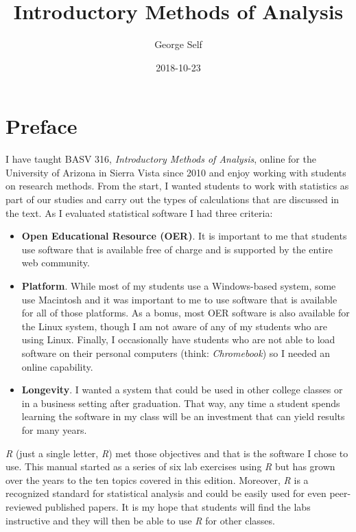 \documentclass[]{book}
\title{Introductory Methods of Analysis}
\author{George Self}
\date{2018-10-23}
\theoremstyle{definition}
\theoremstyle{definition}
\theoremstyle{definition}
\theoremstyle{remark}
\begin{document}
\maketitle

{
\setcounter{tocdepth}{1}
\tableofcontents
}
\hypertarget{preface}{%
\chapter*{Preface}\label{preface}}

I have taught BASV 316, \emph{Introductory Methods of Analysis}, online
for the University of Arizona in Sierra Vista since 2010 and enjoy
working with students on research methods. From the start, I wanted
students to work with statistics as part of our studies and carry out
the types of calculations that are discussed in the text. As I evaluated
statistical software I had three criteria:

\begin{itemize}
\item
  \textbf{Open Educational Resource (OER)}. It is important to me that
  students use software that is available free of charge and is
  supported by the entire web community.
\item
  \textbf{Platform}. While most of my students use a Windows-based
  system, some use Macintosh and it was important to me to use software
  that is available for all of those platforms. As a bonus, most OER
  software is also available for the Linux system, though I am not aware
  of any of my students who are using Linux. Finally, I occasionally
  have students who are not able to load software on their personal
  computers (think: \emph{Chromebook}) so I needed an online capability.
\item
  \textbf{Longevity}. I wanted a system that could be used in other
  college classes or in a business setting after graduation. That way,
  any time a student spends learning the software in my class will be an
  investment that can yield results for many years.
\end{itemize}

\emph{R} (just a single letter, \emph{R}) met those objectives and that
is the software I chose to use. This manual started as a series of six
lab exercises using \emph{R} but has grown over the years to the ten
topics covered in this edition. Moreover, \emph{R} is a recognized
standard for statistical analysis and could be easily used for even
peer-reviewed published papers. It is my hope that students will find
the labs instructive and they will then be able to use \emph{R} for
other classes.
\end{document}
